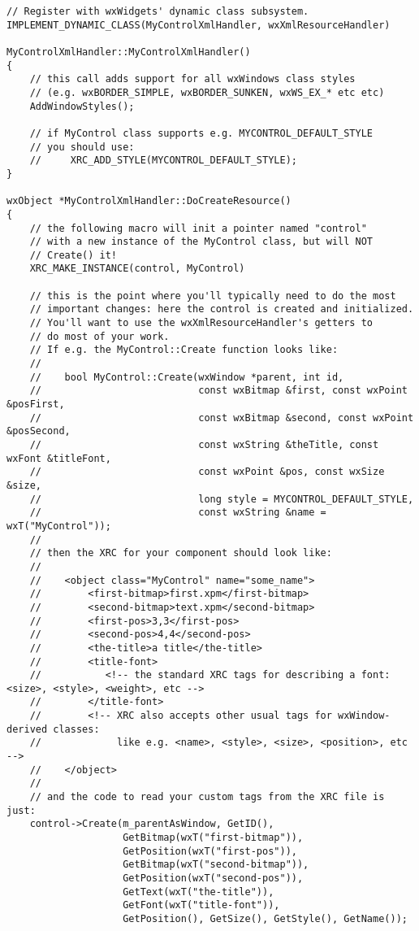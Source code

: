 \begin{verbatim}
// Register with wxWidgets' dynamic class subsystem.
IMPLEMENT_DYNAMIC_CLASS(MyControlXmlHandler, wxXmlResourceHandler)

MyControlXmlHandler::MyControlXmlHandler()
{
    // this call adds support for all wxWindows class styles
    // (e.g. wxBORDER_SIMPLE, wxBORDER_SUNKEN, wxWS_EX_* etc etc)
    AddWindowStyles();

    // if MyControl class supports e.g. MYCONTROL_DEFAULT_STYLE
    // you should use:
    //     XRC_ADD_STYLE(MYCONTROL_DEFAULT_STYLE);
}

wxObject *MyControlXmlHandler::DoCreateResource()
{
    // the following macro will init a pointer named "control"
    // with a new instance of the MyControl class, but will NOT
    // Create() it!
    XRC_MAKE_INSTANCE(control, MyControl)

    // this is the point where you'll typically need to do the most
    // important changes: here the control is created and initialized.
    // You'll want to use the wxXmlResourceHandler's getters to
    // do most of your work.
    // If e.g. the MyControl::Create function looks like:
    //
    //    bool MyControl::Create(wxWindow *parent, int id, 
    //                           const wxBitmap &first, const wxPoint &posFirst,
    //                           const wxBitmap &second, const wxPoint &posSecond,
    //                           const wxString &theTitle, const wxFont &titleFont,
    //                           const wxPoint &pos, const wxSize &size,
    //                           long style = MYCONTROL_DEFAULT_STYLE,
    //                           const wxString &name = wxT("MyControl"));
    //
    // then the XRC for your component should look like:
    //
    //    <object class="MyControl" name="some_name">
    //        <first-bitmap>first.xpm</first-bitmap>
    //        <second-bitmap>text.xpm</second-bitmap>
    //        <first-pos>3,3</first-pos>
    //        <second-pos>4,4</second-pos>
    //        <the-title>a title</the-title>
    //        <title-font>
    //           <!-- the standard XRC tags for describing a font: <size>, <style>, <weight>, etc -->
    //        </title-font>
    //        <!-- XRC also accepts other usual tags for wxWindow-derived classes:
    //             like e.g. <name>, <style>, <size>, <position>, etc -->
    //    </object>
    //
    // and the code to read your custom tags from the XRC file is just:
    control->Create(m_parentAsWindow, GetID(),
                    GetBitmap(wxT("first-bitmap")),
                    GetPosition(wxT("first-pos")),
                    GetBitmap(wxT("second-bitmap")),
                    GetPosition(wxT("second-pos")),
                    GetText(wxT("the-title")),
                    GetFont(wxT("title-font")),
                    GetPosition(), GetSize(), GetStyle(), GetName());


\end{verbatim}
